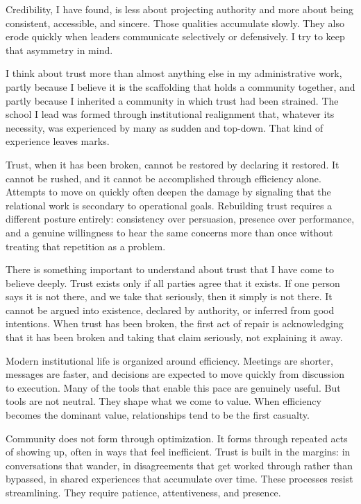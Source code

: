 \documentclass[10pt]{article}
\begin{document}
Credibility, I have found, is less about projecting authority and more about being consistent,
accessible, and sincere. Those qualities accumulate slowly. They also erode quickly when
leaders communicate selectively or defensively. I try to keep that asymmetry in mind.


I think about trust more than almost anything else in my administrative work, partly because I
believe it is the scaffolding that holds a community together, and partly because I inherited a
community in which trust had been strained. The school I lead was formed through institutional
realignment that, whatever its necessity, was experienced by many as sudden and top-down. That
kind of experience leaves marks.

Trust, when it has been broken, cannot be restored by declaring it restored. It cannot be
rushed, and it cannot be accomplished through efficiency alone. Attempts to move on quickly
often deepen the damage by signaling that the relational work is secondary to operational
goals. Rebuilding trust requires a different posture entirely: consistency over persuasion,
presence over performance, and a genuine willingness to hear the same concerns more than once
without treating that repetition as a problem.

There is something important to understand about trust that I have come to believe deeply.
Trust exists only if all parties agree that it exists. If one person says it is not there, and
we take that seriously, then it simply is not there. It cannot be argued into existence,
declared by authority, or inferred from good intentions. When trust has been broken, the first
act of repair is acknowledging that it has been broken and taking that claim seriously, not
explaining it away.


Modern institutional life is organized around efficiency. Meetings are shorter, messages are
faster, and decisions are expected to move quickly from discussion to execution. Many of the
tools that enable this pace are genuinely useful. But tools are not neutral. They shape what we
come to value. When efficiency becomes the dominant value, relationships tend to be the first
casualty.

Community does not form through optimization. It forms through repeated acts of showing up,
often in ways that feel inefficient. Trust is built in the margins: in conversations that
wander, in disagreements that get worked through rather than bypassed, in shared experiences
that accumulate over time. These processes resist streamlining. They require patience,
attentiveness, and presence.
\end{document}
